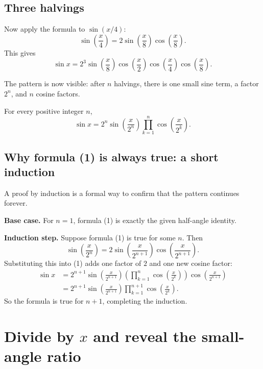 \documentclass[11pt]{article}
\begin{document}
\subsection{Three halvings}

Now apply the formula to \(\sin(x/4)\):
\[
  \sin\!\left(\frac{x}{4}\right)
  =2\sin\!\left(\frac{x}{8}\right)
     \cos\!\left(\frac{x}{8}\right).
\]
This gives
\[
  \sin x
  =2^3\sin\!\left(\frac{x}{8}\right)
  \cos\!\left(\frac{x}{2}\right)
  \cos\!\left(\frac{x}{4}\right)
  \cos\!\left(\frac{x}{8}\right).
\]

The pattern is now visible: after \(n\) halvings, there is one small sine term, a factor \(2^n\), and \(n\) cosine factors.

\begin{solutionBox}
For every positive integer \(n\),
\[
\boxed{\displaystyle
  \sin x
  =2^n\sin\!\left(\frac{x}{2^n}\right)
   \prod_{k=1}^{n}
   \cos\!\left(\frac{x}{2^k}\right).}
\tag{1}
\]
\end{solutionBox}

\subsection{Why formula (1) is always true: a short induction}

A proof by induction is a formal way to confirm that the pattern continues forever.

\textbf{Base case.} For \(n=1\), formula (1) is exactly the given half-angle identity.

\textbf{Induction step.} Suppose formula (1) is true for some \(n\). Then
\[
  \sin\!\left(\frac{x}{2^n}\right)
  =2\sin\!\left(\frac{x}{2^{n+1}}\right)
     \cos\!\left(\frac{x}{2^{n+1}}\right).
\]
Substituting this into (1) adds one factor of \(2\) and one new cosine factor:
\begin{align*}
  \sin x
  &=2^{n+1}\sin\!\left(\frac{x}{2^{n+1}}\right)
    \left(\prod_{k=1}^{n}\cos\!\left(\frac{x}{2^k}\right)\right)
    \cos\!\left(\frac{x}{2^{n+1}}\right)\\
  &=2^{n+1}\sin\!\left(\frac{x}{2^{n+1}}\right)
    \prod_{k=1}^{n+1}\cos\!\left(\frac{x}{2^k}\right).
\end{align*}
So the formula is true for \(n+1\), completing the induction.

\section{Divide by \texorpdfstring{\(x\)}{x} and reveal the small-angle ratio}
\end{document}
